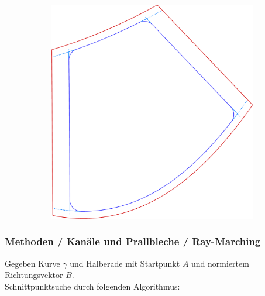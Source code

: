 \documentclass[8pt, aspectratio=169]{beamer}
\begin{document}
\begin{frame}
\begin{figure}
\begin{subfigure}[t]{.48\textwidth}
			\includegraphics[height=.8\textheight]{../tec/chambers/single_constr.png}
		\end{subfigure}
	\end{figure}
\end{frame}

\begin{frame}
	\frametitle{Methoden / Kanäle und Prallbleche / Ray-Marching}
	\hspace{-0.5cm}
	Gegeben Kurve $\gamma$ und Halberade mit Startpunkt $A$ und normiertem Richtungsvektor $B$.\\
	Schnittpunktsuche durch folgenden Algorithmus:
	\begin{minipage}{\textwidth}
		\begin{figure}[H]
			\centering
			
		\end{figure}
	\end{minipage}
\end{frame}
\end{document}
